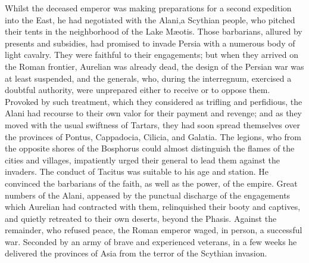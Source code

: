 
Whilst the deceased emperor was making preparations for a second
expedition into the East, he had negotiated with the Alani,\footnotemark[161] a
Scythian people, who pitched their tents in the neighborhood of
the Lake Mæotis. Those barbarians, allured by presents and
subsidies, had promised to invade Persia with a numerous body of
light cavalry. They were faithful to their engagements; but when
they arrived on the Roman frontier, Aurelian was already dead,
the design of the Persian war was at least suspended, and the
generals, who, during the interregnum, exercised a doubtful
authority, were unprepared either to receive or to oppose them.
Provoked by such treatment, which they considered as trifling and
perfidious, the Alani had recourse to their own valor for their
payment and revenge; and as they moved with the usual swiftness
of Tartars, they had soon spread themselves over the provinces of
Pontus, Cappadocia, Cilicia, and Galatia. The legions, who from
the opposite shores of the Bosphorus could almost distinguish the
flames of the cities and villages, impatiently urged their
general to lead them against the invaders. The conduct of Tacitus
was suitable to his age and station. He convinced the barbarians
of the faith, as well as the power, of the empire. Great numbers
of the Alani, appeased by the punctual discharge of the
engagements which Aurelian had contracted with them, relinquished
their booty and captives, and quietly retreated to their own
deserts, beyond the Phasis. Against the remainder, who refused
peace, the Roman emperor waged, in person, a successful war.
Seconded by an army of brave and experienced veterans, in a few
weeks he delivered the provinces of Asia from the terror of the
Scythian invasion.\footnotemark[17]



